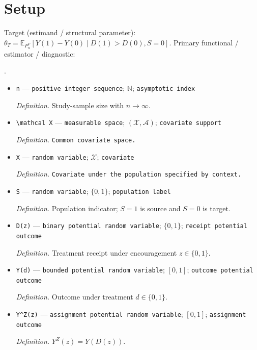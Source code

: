 \documentclass{article}
\begin{document}
\section{Setup}

Target (estimand / structural parameter): \(\theta_T=\mathbb E_{P_n^F}[Y(1)-Y(0)\mid D(1)>D(0),S=0]\).
Primary functional / estimator / diagnostic: \par\noindent {}\par\noindent.
\begin{itemize}
  \item \texttt{n} --- \texttt{positive integer sequence}; \(\mathbb N\); \texttt{asymptotic index}
  \par\smallskip\noindent\emph{Definition.} Study-sample size with \(n\to\infty\).
  \item \texttt{\textbackslash{}\allowbreak{}mathcal X} --- \texttt{measurable space}; \((\mathcal X,\mathcal A)\); \texttt{covariate support}
  \par\smallskip\noindent\emph{Definition.} \texttt{Common covariate space.}
  \item \texttt{X} --- \texttt{random variable}; \(\mathcal X\); \texttt{covariate}
  \par\smallskip\noindent\emph{Definition.} \texttt{Covariate under the population specified by context.}
  \item \texttt{S} --- \texttt{random variable}; \(\{0,1\}\); \texttt{population label}
  \par\smallskip\noindent\emph{Definition.} Population indicator; \(S=1\) is source and \(S=0\) is target.
  \item \texttt{D(z)} --- \texttt{binary potential random variable}; \(\{0,1\}\); \texttt{receipt potential outcome}
  \par\smallskip\noindent\emph{Definition.} Treatment receipt under encouragement \(z\in\{0,1\}\).
  \item \texttt{Y(d)} --- \texttt{bounded potential random variable}; \([0,1]\); \texttt{outcome potential outcome}
  \par\smallskip\noindent\emph{Definition.} Outcome under treatment \(d\in\{0,1\}\).
  \item \texttt{Y\textasciicircum{}Z(z)} --- \texttt{assignment potential random variable}; \([0,1]\); \texttt{assignment outcome}
  \par\smallskip\noindent\emph{Definition.} \(Y^Z(z)=Y(D(z))\).

\end{itemize}
\end{document}
